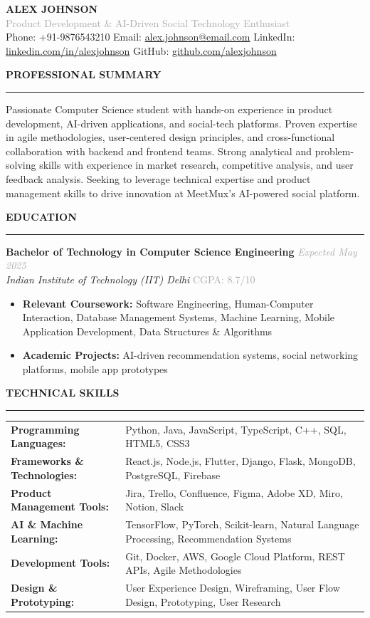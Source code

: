 \documentclass[11pt,a4paper]{article}
\newcommand{\resumesection}[1]{
    \vspace{8pt}
    \textcolor{primarycolor}{\textbf{\Large #1}}
    \vspace{2pt}
    \hrule
    \vspace{6pt}
}
\newcommand{\resumesubsection}[4]{
    \textbf{#1} \hfill \textcolor{darkgray}{\textit{#2}} \\
    \textit{#3} \hfill \textcolor{darkgray}{#4} \\
    \vspace{2pt}
}
\begin{document}
\begin{center}
    {\Huge \textbf{ALEX JOHNSON}} \\
    \vspace{4pt}
    \textcolor{darkgray}{Product Development \& AI-Driven Social Technology Enthusiast} \\
    \vspace{6pt}
    Phone: +91-9876543210 \quad
    Email: \href{mailto:alex.johnson@email.com}{alex.johnson@email.com} \quad
    LinkedIn: \href{https://linkedin.com/in/alexjohnson}{linkedin.com/in/alexjohnson} \quad
    GitHub: \href{https://github.com/alexjohnson}{github.com/alexjohnson}
\end{center}

\vspace{10pt}

\resumesection{PROFESSIONAL SUMMARY}
Passionate Computer Science student with hands-on experience in product development, AI-driven applications, and social-tech platforms. Proven expertise in agile methodologies, user-centered design principles, and cross-functional collaboration with backend and frontend teams. Strong analytical and problem-solving skills with experience in market research, competitive analysis, and user feedback analysis. Seeking to leverage technical expertise and product management skills to drive innovation at MeetMux's AI-powered social platform.

\resumesection{EDUCATION}
\resumesubsection{Bachelor of Technology in Computer Science Engineering}{Expected May 2025}{Indian Institute of Technology (IIT) Delhi}{CGPA: 8.7/10}
\begin{itemize}[leftmargin=15pt, itemsep=2pt]
    \item \textbf{Relevant Coursework:} Software Engineering, Human-Computer Interaction, Database Management Systems, Machine Learning, Mobile Application Development, Data Structures \& Algorithms
    \item \textbf{Academic Projects:} AI-driven recommendation systems, social networking platforms, mobile app prototypes
\end{itemize}

\resumesection{TECHNICAL SKILLS}
\begin{tabularx}{\textwidth}{@{}l X@{}}
\textbf{Programming Languages:} & Python, Java, JavaScript, TypeScript, C++, SQL, HTML5, CSS3 \\
\textbf{Frameworks \& Technologies:} & React.js, Node.js, Flutter, Django, Flask, MongoDB, PostgreSQL, Firebase \\
\textbf{Product Management Tools:} & Jira, Trello, Confluence, Figma, Adobe XD, Miro, Notion, Slack \\
\textbf{AI \& Machine Learning:} & TensorFlow, PyTorch, Scikit-learn, Natural Language Processing, Recommendation Systems \\
\textbf{Development Tools:} & Git, Docker, AWS, Google Cloud Platform, REST APIs, Agile Methodologies \\
\textbf{Design \& Prototyping:} & User Experience Design, Wireframing, User Flow Design, Prototyping, User Research \\
\end{tabularx}
\end{document}
